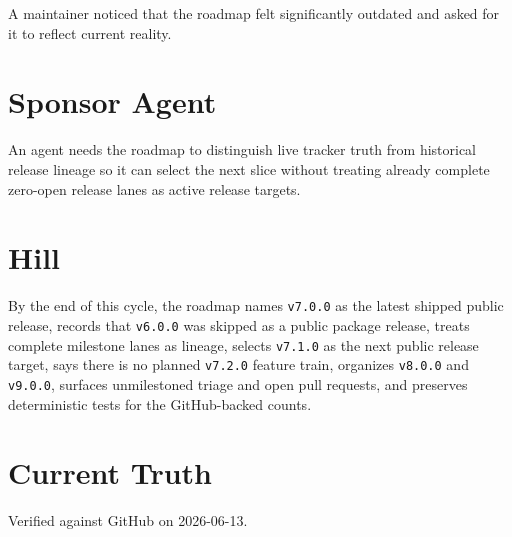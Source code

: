 A maintainer noticed that the roadmap felt significantly outdated and asked for it to reflect current reality.

\section{Sponsor Agent}\label{record-213-sponsor-agent}

An agent needs the roadmap to distinguish live tracker truth from historical release lineage so it can select the next slice without treating already complete zero-open release lanes as active release targets.

\section{Hill}\label{record-213-hill}

By the end of this cycle, the roadmap names \texttt{v\allowbreak{}7\allowbreak{}.\allowbreak{}0\allowbreak{}.\allowbreak{}0} as the latest shipped public release, records that \texttt{v\allowbreak{}6\allowbreak{}.\allowbreak{}0\allowbreak{}.\allowbreak{}0} was skipped as a public package release, treats complete milestone lanes as lineage, selects \texttt{v\allowbreak{}7\allowbreak{}.\allowbreak{}1\allowbreak{}.\allowbreak{}0} as the next public release target, says there is no planned \texttt{v\allowbreak{}7\allowbreak{}.\allowbreak{}2\allowbreak{}.\allowbreak{}0} feature train, organizes \texttt{v\allowbreak{}8\allowbreak{}.\allowbreak{}0\allowbreak{}.\allowbreak{}0} and \texttt{v\allowbreak{}9\allowbreak{}.\allowbreak{}0\allowbreak{}.\allowbreak{}0}, surfaces unmilestoned triage and open pull requests, and preserves deterministic tests for the GitHub-backed counts.

\section{Current Truth}\label{record-213-current-truth}

Verified against GitHub on 2026-06-13.

